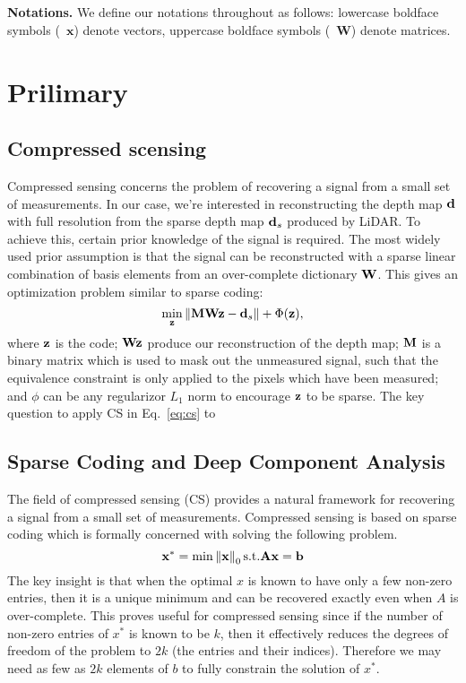\\
\\
\noindent\textbf{Notations.} We define our notations throughout as follows: lowercase boldface symbols (\eg~$\mathbf{x}$) denote vectors, uppercase boldface symbols (\eg~$\mathbf{W}$) denote matrices.
 
\section{Prilimary}
\subsection{Compressed scensing}
Compressed sensing concerns the problem of recovering a signal from a small set of measurements. In our case, we're interested in reconstructing the depth map $\mathbf{d}$ with full resolution from the sparse depth map $\mathbf{d}_s$ produced by LiDAR. To achieve this, certain prior knowledge of the signal is required. The most widely used prior assumption is that the signal can be reconstructed with a sparse linear combination of basis elements from an over-complete dictionary $\mathbf{W}$. This gives an optimization problem similar to sparse coding:
\begin{equation}
    \min_{\mathbf{z}} \Vert \mathbf{M}\mathbf{W}\mathbf{z} - \mathbf{d}_s \Vert + \Phi(\mathbf{z}),
    \label{eq:cs}
\end{equation}
where $\mathbf{z}$ is the code; $\mathbf{W}\mathbf{z}$ produce our reconstruction of the depth map; $\mathbf{M}$ is a binary matrix which is used to mask out the unmeasured signal, such that the equivalence constraint is only applied to the pixels which have been measured; and $\phi$ can be any regularizor \eg $L_1$ norm to encourage $\mathbf{z}$ to be sparse.
The key question to apply CS in Eq.~\ref{eq:cs} to 

\subsection{Sparse Coding and Deep Component Analysis}
\label{sec:compr-sens-deep}

The field of compressed sensing (CS) provides a natural framework for recovering a signal from a small set of measurements. Compressed sensing is based on sparse coding which is formally concerned with solving the following problem. 
\begin{equation}
  \label{eq:1}
  \mathbf{x}^* = \min \left\Vert\mathbf{x}\right\Vert_0 \text{s.t.} \mathbf{A}\mathbf{x} = \mathbf{b}
\end{equation}
The key insight is that when the optimal $x$ is known to have only a few non-zero entries, then it is a unique minimum and can be recovered exactly even when $A$ is over-complete. This proves useful for compressed sensing since if the number of non-zero entries of $x^*$ is known to be $k$, then it effectively reduces the degrees of freedom of the problem to $2k$ (the entries and their indices). Therefore we may need as few as $2k$ elements of $b$ to fully constrain the solution of $x^{*}$.\\

